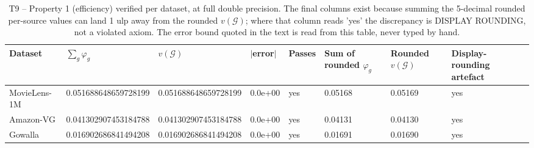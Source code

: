 \begin{table}[htbp]
\centering
\footnotesize
\caption{T9 -- Property 1 (efficiency) verified per dataset, at full double precision. The final columns exist because summing the 5-decimal rounded per-source values can land 1 ulp away from the rounded $v(\mathcal{G})$; where that column reads 'yes' the discrepancy is DISPLAY ROUNDING, not a violated axiom. The error bound quoted in the text is read from this table, never typed by hand.}
\label{tab:T9_efficiency}
\begin{tabular}{llllllll}
\toprule
Dataset & $\sum_g \varphi_g$ & $v(\mathcal{G})$ & $|$error$|$ & Passes & Sum of rounded $\varphi_g$ & Rounded $v(\mathcal{G})$ & Display-rounding artefact \\
\midrule
MovieLens-1M & 0.051688648659728199 & 0.051688648659728199 & 0.0e+00 & yes & 0.05168 & 0.05169 & yes \\
Amazon-VG & 0.041302907453184788 & 0.041302907453184788 & 0.0e+00 & yes & 0.04131 & 0.04130 & yes \\
Gowalla & 0.016902686841494208 & 0.016902686841494208 & 0.0e+00 & yes & 0.01691 & 0.01690 & yes \\
\bottomrule
\end{tabular}
\end{table}
